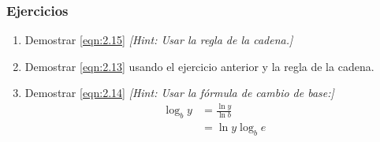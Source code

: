 \subsubsection{Ejercicios}

\begin{enumerate}
	\item Demostrar \cref{eqn:2.15} \textsl{[Hint: Usar la regla de la cadena.]}
	\item Demostrar \cref{eqn:2.13} usando el ejercicio anterior y la regla de la cadena.
	\item Demostrar \cref{eqn:2.14} \textsl{[Hint: Usar la fórmula de cambio de base:]
		\begin{align*}
		\log_b y&=\frac{\ln y}{\ln b}\\
		&=\ln y\log_b e
		\end{align*}}
\end{enumerate}